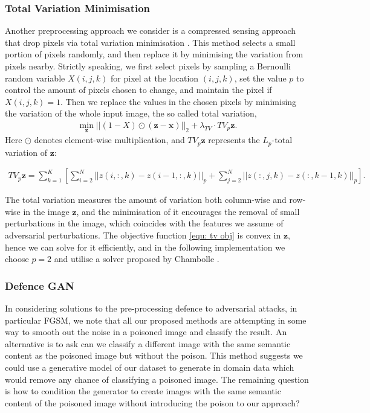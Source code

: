 \subsubsection{Total Variation Minimisation} 
Another preprocessing approach we consider is a compressed sensing approach that drop pixels via total variation minimisation \cite{Rudin:1992:NTV:142273.142312}. This method selects a small portion of pixels randomly, and then replace it by minimising the variation from pixels nearby. Strictly speaking, we first select pixels by sampling a Bernoulli random variable $X(i,j,k)$ for pixel at the location $(i,j,k)$, set the value $p$ to control the amount of pixels chosen to change, and maintain the pixel if $X(i,j,k) = 1$. Then we replace the values in the chosen pixels by minimising the variation of the whole input image, the so called total variation, 
\begin{align}
	\min_{\mathbf{z}}||(1 - X) \odot (\mathbf{z} - \mathbf{x})||_2 + \lambda_{TV}\cdot TV_p{\mathbf{z}}.
	\label{equ: tv obj}
\end{align}
Here $\odot$ denotes element-wise multiplication, and $TV_p{\mathbf{z}}$ represents the $L_p$-total variation of $\mathbf{z}$:

\begin{align}
	TV_p{\mathbf{z}} = \sum_{k = 1}^{K}\left[\sum_{i=2}^{N}||z(i,:,k) - z(i-1, :, k)||_p + \sum_{j = 2}^{N}||z(:,j,k) - z(:,k-1,k)||_p\right].
\end{align}

The total variation measures the amount of variation both column-wise and row-wise in the image $\mathbf{z}$, and the minimisation of it encourages the removal of small perturbations in the image, which coincides with the features we assume of adversarial perturbations. The objective function \ref{equ: tv obj} is convex in $\mathbf{z}$, hence we can solve for it efficiently, and in the following implementation we choose $p = 2$ and utilise a solver proposed by Chambolle \cite{Chambolle:2004:ATV:964969.964985}. 


\subsubsection{Defence GAN}
In considering solutions to the pre-processing defence to adversarial attacks, in particular FGSM, we note that all our proposed methods are attempting in some way to smooth out the noise in a poisoned image and classify the result. An alternative is to ask can we classify a different image with the same semantic content as the poisoned image but without the poison.  This method suggests we could use a generative model of our dataset to generate in domain data which would remove any chance of classifying a poisoned image.  The remaining question is how to condition the generator to create images with the same semantic content of the poisoned image without introducing the poison to our approach?

